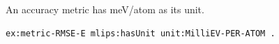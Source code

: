 An accuracy metric has meV/atom as its unit.
\begin{lstlisting}[language=turtle]
ex:metric-RMSE-E mlips:hasUnit unit:MilliEV-PER-ATOM .
\end{lstlisting}
